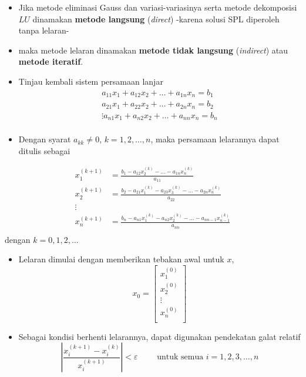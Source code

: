 \documentclass[pdflatex,compress,mathserif]{beamer}
\begin{document}
\begin{frame}
	\begin{itemize}
		\item Jika metode eliminasi Gauss dan variasi-variasinya serta
		metode dekomposisi $ LU $ dinamakan \textbf{metode langsung} (\textit{direct}) -karena solusi SPL diperoleh tanpa lelaran-
		\item maka metode lelaran dinamakan \textbf{metode tidak langsung} (\textit{indirect}) atau \textbf{metode iteratif}.
		\item Tinjau kembali sistem persamaan lanjar
		\begin{align*}
			a_{11}x_1 + a_{12}x_2 + \dots + a_{1n}x_n = b_1 \\
			a_{21}x_1 + a_{22}x_2 + \dots + a_{2n}x_n = b_2 \\
			\vdots
			a_{n1}x_1 + a_{n2}x_2 + \dots + a_{nn}x_n = b_n \\
		\end{align*}
		\item Dengan syarat $ a_{kk} \neq 0 $, $ k = 1, 2, \dots, n $, maka persamaan lelarannya dapat ditulis sebagai
	\end{itemize}
\end{frame}

\begin{frame}
	\begin{align*}
	x_1^{(k+1)} &= \frac{b_1 - a_{12}x_2^{(k)} - \dots - a_{1n}x_n^{(k)}}{a_{11}} \\
	x_2^{(k+1)} &= \frac{b_2 - a_{21}x_1^{(k)}- a_{23}x_3^{(k)} - \dots - a_{2n}x_n^{(k)}}{a_{22}} \\
	\vdots\\
	x_n^{(k+1)} &= \frac{b_n - a_{n1}x_1^{(k)}- a_{n2}x_2^{(k)} - \dots - a_{nn-1}x_{n-1}^{(k)}}{a_{nn}} \\
	\end{align*}
	dengan $ k = 0, 1, 2, \dots $
\end{frame}

\begin{frame}
	\begin{itemize}
		\item Lelaran dimulai dengan memberikan tebakan awal untuk $ x $,
		\[ x_0 = \begin{bmatrix}
		x_1^{(0)} \\ x_2^{(0)} \\ \vdots \\ x_n^{(0)} \\ 
		\end{bmatrix} \]
		\item Sebagai kondisi berhenti lelarannya, dapat digunakan pendekatan galat relatif
		\[ \left| \frac{x_i^{(k+1)}-x_i^{(k)}}{x_i^{(k+1)}} \right| < \varepsilon \qquad \text{ untuk semua } i = 1,2,3,\dots,n \]
	\end{itemize}
\end{frame}
\end{document}
